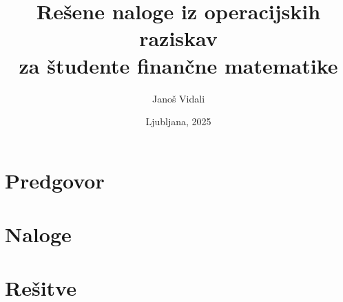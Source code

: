 \documentclass[a4paper, 11pt, titlepage, twoside]{article}
\begin{document}
\title{Rešene naloge iz operacijskih raziskav \\
{\Large za študente finančne matematike}}
\author{\Large Janoš Vidali}
\date{\vfill Ljubljana, 2025}
\maketitle

\cleardoublepage

\setcounter{tocdepth}{2}
\tableofcontents

\cleardoublepage

\section*{Predgovor}

{



}

\cleardoublepage



\section{Naloge}
{


}

\cleardoublepage

\section{Rešitve}
{


}

\cleardoublepage



\end{document}
